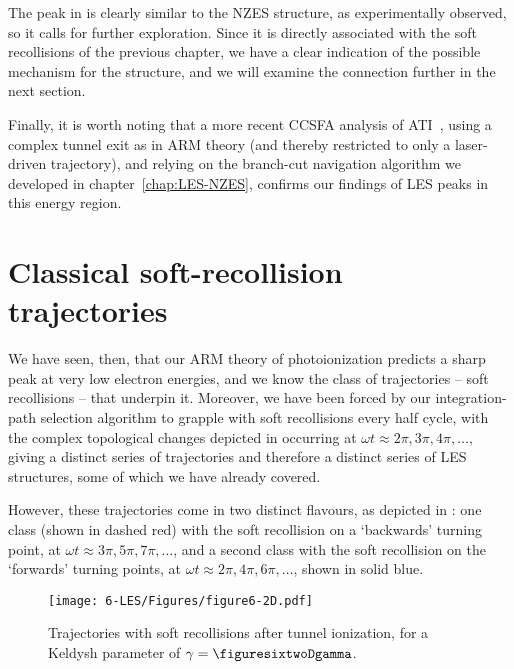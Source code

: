 The peak in  is clearly similar to the NZES structure, as experimentally observed, so it calls for further exploration. Since it is directly associated with the soft recollisions of the previous chapter, we have a clear indication of the possible mechanism for the structure, and we will examine the connection further in the next section.




Finally, it is worth noting that a more recent CCSFA analysis of ATI~\cite{ keil_branch-cuts_2016}, using a complex tunnel exit as in ARM theory (and thereby restricted to only a laser-driven trajectory), and relying on the branch-cut navigation algorithm we developed in chapter~\ref{chap:LES-NZES}, confirms our findings of LES peaks in this energy region.









\section{Classical soft-recollision trajectories}
\label{sec:classical-soft-recollisions}
We have seen, then, that our ARM theory of photoionization predicts a sharp peak at very low electron energies, and we know the class of trajectories -- soft recollisions -- that underpin it. Moreover, we have been forced by our integration-path selection algorithm to grapple with soft recollisions every half cycle, with the complex topological changes depicted in  occurring at $\omega t\approx 2\pi,3\pi,4\pi,\ldots$, giving a distinct series of trajectories and therefore a distinct series of LES structures, some of which we have already covered.

However, these trajectories come in two distinct flavours, as depicted in : one class (shown in dashed red) with the soft recollision on a `backwards' turning point, at $\omega t\approx 3\pi, 5\pi, 7\pi, \ldots$, and a second class with the soft recollision on the `forwards' turning points, at $\omega t\approx 2\pi, 4\pi, 6\pi, \ldots$, shown in solid blue.



\begin{figure}[ht]
  \centering
  \texttt{[image: 6-LES/Figures/figure6-2D.pdf]}
  \caption[
  Trajectories with soft recollisions, both on the backwards swing and the forwards turning point
  ]{
  Trajectories with soft recollisions after tunnel ionization, for a Keldysh parameter of  $\gamma=\figuresixtwoDgamma$.}
  \label{f6-trajectories-at-transitions}
\end{figure}


